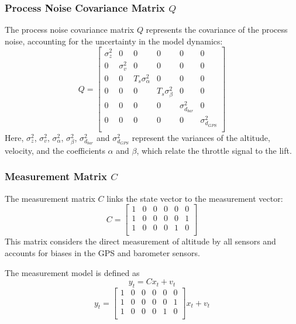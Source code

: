 \documentclass{article}
\begin{document}
    \subsubsection*{Process Noise Covariance Matrix \( Q \)}
    The process noise covariance matrix \( Q \) represents the covariance of the process noise, accounting for the uncertainty in the model dynamics:
    \begin{equation}
    Q = 
    \begin{bmatrix}
    \sigma_z^2 & 0 & 0 & 0 & 0 & 0 \\
    0 & \sigma_v^2 & 0 & 0 & 0 & 0 \\
    0 & 0 & T_s \sigma_\alpha^2 & 0 & 0 & 0 \\
    0 & 0 & 0 & T_s \sigma_\beta^2 & 0 & 0 \\
    0 & 0 & 0 & 0 & \sigma^2_{d_{bar}} & 0 \\
    0 & 0 & 0 & 0 & 0 & \sigma^2_{d_{GPS}} \\
    \end{bmatrix}
    \end{equation}
    Here, \( \sigma_z^2 \), \( \sigma_v^2 \), \( \sigma_\alpha^2 \), \( \sigma_\beta^2 \), \( \sigma^2_{d_{bar}} \) and \( \sigma^2_{d_{GPS}} \) represent the variances of the altitude, velocity, and the coefficients \( \alpha \) and \( \beta \), which relate the throttle signal to the lift.

    \subsubsection*{Measurement Matrix \( C \)}
    The measurement matrix \( C \) links the state vector to the measurement vector:
    \begin{equation}
    C = 
    \begin{bmatrix}
    1 & 0 & 0 & 0 & 0 & 0 \\
    1 & 0 & 0 & 0 & 0 & 1 \\
    1 & 0 & 0 & 0 & 1 & 0 \\
    \end{bmatrix}
    \end{equation}
    This matrix considers the direct measurement of altitude by all sensors and accounts for biases in the GPS and barometer sensors.

    The measurement model is defined as
    \begin{equation}
    y_t = C x_t + v_t
    \end{equation}
    \begin{equation}
        y_t  = 
        \begin{bmatrix}
            1 & 0 & 0 & 0 & 0 & 0 \\
            1 & 0 & 0 & 0 & 0 & 1 \\
            1 & 0 & 0 & 0 & 1 & 0 \\
        \end{bmatrix}
            x_t + v_t
    \end{equation}
\end{document}
